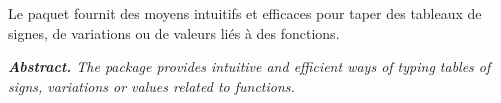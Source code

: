 \documentclass[12pt, a4paper]{article}
\begin{document}
\noindent
Le paquet  fournit des moyens intuitifs et efficaces pour taper des tableaux de signes, de variations ou de valeurs liés à des fonctions.




\tdocsep

{\noindent
\small\itshape
\textbf{Abstract.}
The  package provides intuitive and efficient ways of typing tables of signs, variations or values related to functions.
}
\end{document}
